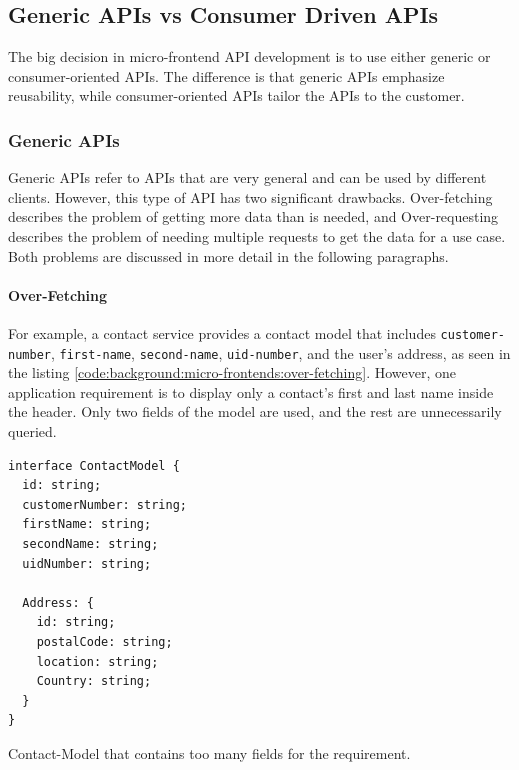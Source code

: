 \subsection{Generic APIs vs Consumer Driven APIs}\label{subsection:background:micro-frontend:generic-vs-consumer-driven-apis}

The big decision in micro-frontend API development is to use either generic or consumer-oriented APIs. The difference is that generic APIs emphasize reusability, while consumer-oriented APIs tailor the APIs to the customer.

\subsubsection{Generic APIs}\label{subsubsection:background:micro-frontend:generic-vs-consumer-driven-apis:generic-apis}

Generic APIs refer to APIs that are very general and can be used by different clients. However, this type of API has two significant drawbacks. Over-fetching describes the problem of getting more data than is needed, and Over-requesting describes the problem of needing multiple requests to get the data for a use case. Both problems are discussed in more detail in the following paragraphs. \cite{misc:2019:leitner:background:micro-frontends:backend-for-frontends}

\paragraph{Over-Fetching}\label{paragraph:background:micro-frontend:generic-vs-consumer-driven-apis:generic-apis:over-fetching}


For example, a contact service provides a contact model that includes \texttt{customer-number}, \texttt{first-name}, \texttt{second-name}, \texttt{uid-number}, and the user's address, as seen in the listing \ref{code:background:micro-frontends:over-fetching}. However, one application requirement is to display only a contact's first and last name inside the header. Only two fields of the model are used, and the rest are unnecessarily queried. \cite{misc:2019:leitner:background:micro-frontends:backend-for-frontends}

\ifshowListings
\begin{listing}[H]
    \begin{verbatim}
interface ContactModel {
  id: string;
  customerNumber: string;
  firstName: string;
  secondName: string;
  uidNumber: string;

  Address: {
    id: string;
    postalCode: string;
    location: string;
    Country: string;
  }
}
    \end{verbatim}
    \caption{Contact-Model that contains too many fields for the requirement.}\label{code:background:micro-frontends:over-fetching}
\end{listing}
\fi

